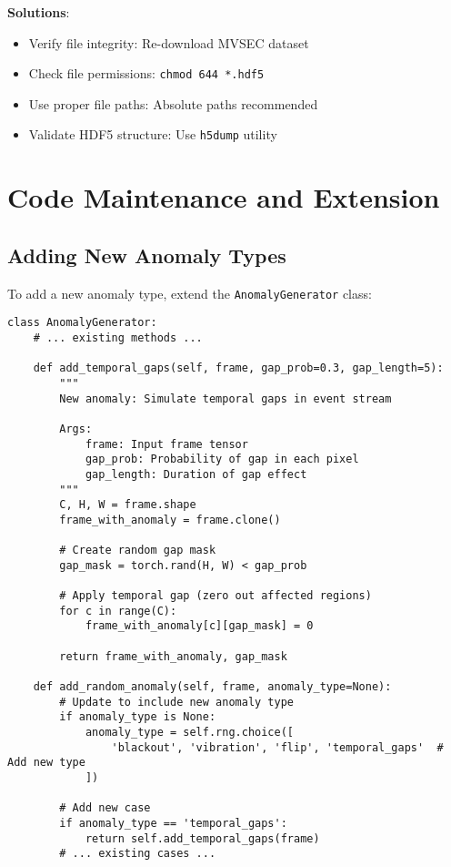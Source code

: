 \documentclass[12pt,a4paper]{article}
\begin{document}
\textbf{Solutions}:
\begin{itemize}
    \item Verify file integrity: Re-download MVSEC dataset
    \item Check file permissions: \texttt{chmod 644 *.hdf5}
    \item Use proper file paths: Absolute paths recommended
    \item Validate HDF5 structure: Use \texttt{h5dump} utility
\end{itemize}

\section{Code Maintenance and Extension}

\subsection{Adding New Anomaly Types}

To add a new anomaly type, extend the \texttt{AnomalyGenerator} class:

\begin{lstlisting}[caption={Adding Custom Anomaly Type}]
class AnomalyGenerator:
    # ... existing methods ...
    
    def add_temporal_gaps(self, frame, gap_prob=0.3, gap_length=5):
        """
        New anomaly: Simulate temporal gaps in event stream
        
        Args:
            frame: Input frame tensor
            gap_prob: Probability of gap in each pixel
            gap_length: Duration of gap effect
        """
        C, H, W = frame.shape
        frame_with_anomaly = frame.clone()
        
        # Create random gap mask
        gap_mask = torch.rand(H, W) < gap_prob
        
        # Apply temporal gap (zero out affected regions)
        for c in range(C):
            frame_with_anomaly[c][gap_mask] = 0
        
        return frame_with_anomaly, gap_mask
    
    def add_random_anomaly(self, frame, anomaly_type=None):
        # Update to include new anomaly type
        if anomaly_type is None:
            anomaly_type = self.rng.choice([
                'blackout', 'vibration', 'flip', 'temporal_gaps'  # Add new type
            ])
        
        # Add new case
        if anomaly_type == 'temporal_gaps':
            return self.add_temporal_gaps(frame)
        # ... existing cases ...
\end{lstlisting}
\end{document}
